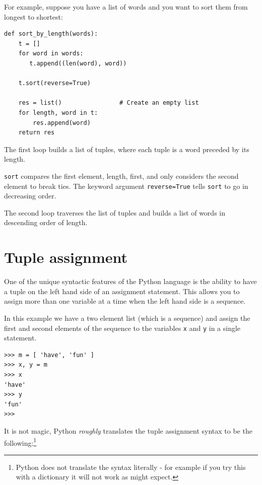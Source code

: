 \documentclass[10pt]{book}
\begin{document}
\label{DSU}

For example, suppose you have a list of words and you want to
sort them from longest to shortest:

\beforeverb
\begin{verbatim}
def sort_by_length(words):
    t = []
    for word in words:
       t.append((len(word), word))

    t.sort(reverse=True)

    res = list()                # Create an empty list
    for length, word in t:
        res.append(word)
    return res
\end{verbatim}
\afterverb
%
The first loop builds a list of tuples, where each
tuple is a word preceded by its length.

{\tt sort} compares the first element, length, first, and
only considers the second element to break ties.  The keyword argument
{\tt reverse=True} tells {\tt sort} to go in decreasing order.


The second loop traverses the list of tuples and builds a list of
words in descending order of length.


\section{Tuple assignment}
\label{tuple assignment}


One of the unique syntactic features of the Python language
is the ability to have a tuple on the left hand
side of an assignment statement.  This allows you to assign
more than one variable at a time when the left hand side is a 
sequence.

In this example we have a two element list (which is a sequence) and
assign the first and second elements of the sequence
to the variables {\tt x} and {\tt y} in a single statement.

\beforeverb
\begin{verbatim}
>>> m = [ 'have', 'fun' ]
>>> x, y = m
>>> x
'have'
>>> y
'fun'
>>> 
\end{verbatim}
\afterverb
%
It is not magic, Python {\em roughly} translates the 
tuple assignment syntax
to be the following:\footnote{Python does not translate the 
syntax literally - for example if you try this with a dictionary
it will not work as might expect.}
\end{document}
